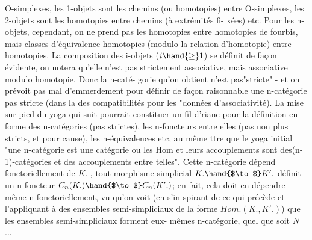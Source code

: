 
O-simplexes, les 1-objets sont les chemins  (ou homotopies) entre
O-simplexes, les 2-objets sont les homotopies entre chemins (à extrémités fi-%
xées) etc. Pour les n-objets, cependant, on ne prend pas les homotopies
entre homotopies de fourbis, mais classes d'équivalence homotopies
(modulo la relation d'homotopie) entre homotopies. La composition des
i-objets ($i\hand{\geq}1$) se définit de façon évidente, on notera qu'elle n'est pas
strictement associative, mais associative modulo homotopie. Donc la n-caté-%
gorie qu'on obtient n'est pas"stricte" - et on prévoit pas mal d'emmerdement
pour définir de façon raisonnable une n-catégorie pas stricte (dans la
\hand{/}des compatibilités  pour les "données d'associativité). La
mise sur pied du yoga qui suit pourrait constituer un fil d'riane pour la
définition en forme des n-catégories (pas strictes), les n-foncteurs entre
elles (pas non plus stricts, et pour cause), les n-équivalences etc, au
même ttre que le yoga initial "une n-catégorie est une catégorie ou les
Hom et leurs accouplements  sont des(n-1)-catégories et des accouplements
entre telles". Cette n-catégorie  dépend fonctoriellement de $K.$ , tout
morphisme simplicial $K. \hand{$\to$} K'.$ définit un n-foncteur $C_n(K.)\hand{$\to$}C_n(K'.)$; en
fait, cela doit en dépendre même n-fonctoriellement, vu qu'on voit (en s'in%
spirant de ce qui précède et l'appliquant à des ensembles semi-simpliciaux
de la forme $Hom.(K.,K'.)$) que les ensembles semi-simpliciaux forment eux-%
mêmes  n-catégorie, quel que soit $N$ ...

